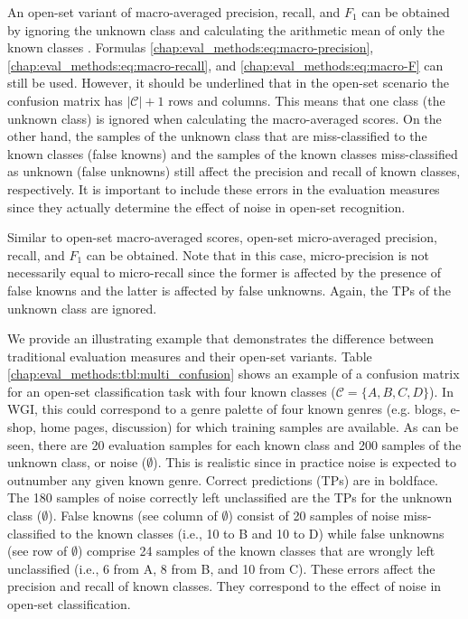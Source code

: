 An open-set variant of macro-averaged precision, recall, and $F_{1}$ can be obtained by ignoring the unknown class and calculating the arithmetic mean of only the known classes \parencite{mendesjunior2016}. Formulas \ref{chap:eval_methods:eq:macro-precision}, \ref{chap:eval_methods:eq:macro-recall}, and \ref{chap:eval_methods:eq:macro-F} can still be used. However, it should be underlined that in the open-set scenario the confusion matrix has $|\mathcal{C}|+1$ rows and columns. This means that one class (the unknown class) is ignored when calculating the macro-averaged scores. On the other hand, the samples of the unknown class that are miss-classified to the known classes (false knowns) and the samples of the known classes miss-classified as unknown (false unknowns) still affect the precision and recall of known classes, respectively. It is important to include these errors in the evaluation measures since they actually determine the effect of noise in open-set recognition.

Similar to open-set macro-averaged scores, open-set micro-averaged precision, recall, and $F_{1}$ can be obtained. Note that in this case, micro-precision is not necessarily equal to micro-recall since the former is affected by the presence of false knowns and the latter is affected by false unknowns. Again, the TPs of the unknown class are ignored. 

We provide an illustrating example that demonstrates the difference between traditional evaluation measures and their open-set variants. Table \ref{chap:eval_methods:tbl:multi_confusion} shows an example of a confusion matrix for an open-set classification task with four known classes ($\mathcal{C}=\{A,B,C,D\}$). In WGI, this could correspond to a genre palette of four known genres (e.g. blogs, e-shop, home pages, discussion) for which training samples are available. As can be seen, there are 20 evaluation samples for each known class and 200 samples of the unknown class, or noise ($\emptyset$). This is realistic since in practice noise is expected to outnumber any given known genre. Correct predictions (TPs) are in boldface. The 180 samples of noise correctly left unclassified are the TPs for the unknown class ($\emptyset$). False knowns (see column of $\emptyset$) consist of 20 samples of noise miss-classified to the known classes (i.e., 10 to B and 10 to D) while false unknowns (see row of $\emptyset$) comprise 24 samples of the known classes that are wrongly left unclassified (i.e., 6 from A, 8 from B, and 10 from C). These errors affect the precision and recall of known classes. They correspond to the effect of noise in open-set classification.

